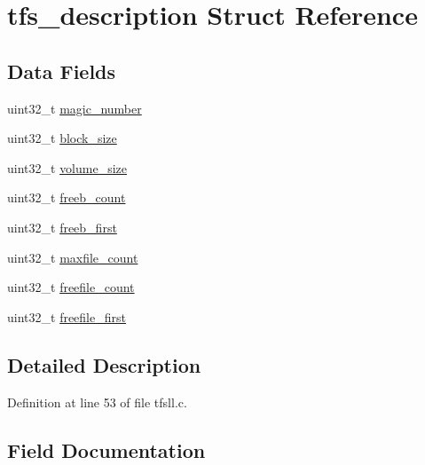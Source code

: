 \hypertarget{structtfs__description}{}\section{tfs\+\_\+description Struct Reference}
\label{structtfs__description}
\subsection*{Data Fields}
\begin{DoxyCompactItemize}
\item 
uint32\+\_\+t \hyperlink{structtfs__description_a45eaf7e07ea0226c1328ee7d4a5f7948}{magic\+\_\+number}
\item 
uint32\+\_\+t \hyperlink{structtfs__description_a9e3fb1e50a1c71b2337df296222d9553}{block\+\_\+size}
\item 
uint32\+\_\+t \hyperlink{structtfs__description_a3c0f4e18beea4efdae616c390877c597}{volume\+\_\+size}
\item 
uint32\+\_\+t \hyperlink{structtfs__description_ae76a323f9769cc3eb9c8e296f1c64abb}{freeb\+\_\+count}
\item 
uint32\+\_\+t \hyperlink{structtfs__description_a37581d658336756f30112b5ef80bada3}{freeb\+\_\+first}
\item 
uint32\+\_\+t \hyperlink{structtfs__description_a6f1ffc34987098c5c1695bf4e99475cf}{maxfile\+\_\+count}
\item 
uint32\+\_\+t \hyperlink{structtfs__description_a145aa9b552e55f616610f2b412251c31}{freefile\+\_\+count}
\item 
uint32\+\_\+t \hyperlink{structtfs__description_a3d4253341d8bca005cbe655683b7ffb2}{freefile\+\_\+first}
\end{DoxyCompactItemize}


\subsection{Detailed Description}


Definition at line 53 of file tfsll.\+c.



\subsection{Field Documentation}
\hypertarget{structtfs__description_a9e3fb1e50a1c71b2337df296222d9553}{}
